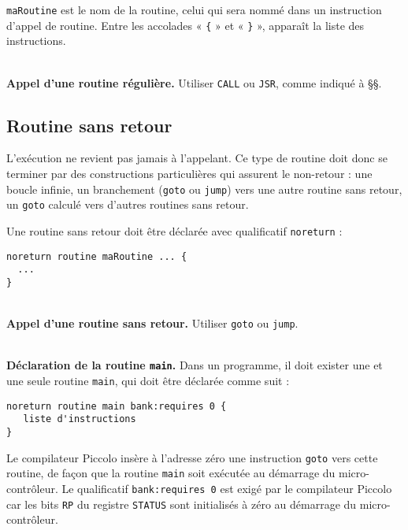 \texttt{maRoutine} est le nom de la routine, celui qui sera nommé dans un instruction d’appel de routine. Entre les accolades « \texttt{\{} » et « \texttt{\}} », apparaît la liste des instructions.

~\\
\textbf{Appel d’une routine régulière.} Utiliser \texttt{CALL} ou \texttt{JSR}, comme indiqué à §§.

\subsection{Routine sans retour}

L’exécution ne revient pas jamais à l’appelant. Ce type de routine doit donc se terminer par des constructions particulières qui assurent le non-retour : une boucle infinie, un branchement (\texttt{goto} ou \texttt{jump}) vers une autre routine sans retour, un \texttt{goto} calculé vers d’autres routines sans retour.

Une routine sans retour doit être déclarée avec qualificatif \texttt{noreturn} :
\begin{lstlisting}[language=piccolo]
noreturn routine maRoutine ... {
  ...
}
\end{lstlisting}

~\\
\textbf{Appel d’une routine sans retour.} Utiliser \texttt{goto} ou \texttt{jump}.


~\\
\textbf{Déclaration de la routine \texttt{main}.} Dans un programme, il doit exister une et une seule routine \texttt{main}, qui doit être déclarée comme suit :

\begin{lstlisting}[language=piccolo]
noreturn routine main bank:requires 0 {
   liste d'instructions
}

\end{lstlisting}

Le compilateur Piccolo insère à l’adresse zéro une instruction \texttt{goto} vers cette routine, de façon que la routine \texttt{main} soit exécutée au démarrage du micro-contrôleur. Le qualificatif \texttt{bank:requires 0} est exigé par le compilateur Piccolo car les bits \texttt{RP} du registre \texttt{STATUS} sont initialisés à zéro au démarrage du micro-contrôleur.


